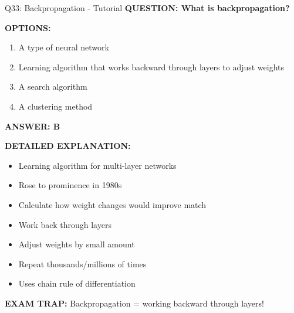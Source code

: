 \documentclass[8pt]{beamer}
\begin{document}
	\begin{frame}{Q33: Backpropagation - Tutorial}
		\fontsize{6.5}{7.5}\selectfont
		\textbf{QUESTION: What is backpropagation?}
		
		\vspace{0.1cm}
		\textbf{OPTIONS:}
		\begin{enumerate}
			\item A type of neural network
			\item Learning algorithm that works backward through layers to adjust weights
			\item A search algorithm
			\item A clustering method
		\end{enumerate}
		
		\vspace{0.1cm}
		\textcolor{myblue}{\textbf{ANSWER: B}}
		
		\vspace{0.1cm}
		\textbf{DETAILED EXPLANATION:}
		\begin{itemize}
			\item Learning algorithm for multi-layer networks
			\item Rose to prominence in 1980s
			\item Calculate how weight changes would improve match
			\item Work back through layers
			\item Adjust weights by small amount
			\item Repeat thousands/millions of times
			\item Uses chain rule of differentiation
		\end{itemize}
		
		\vspace{0.1cm}
		\textcolor{myred}{\textbf{EXAM TRAP:}} Backpropagation = \textcolor{myblue}{working backward through layers}!
	\end{frame}
	
\end{document}
